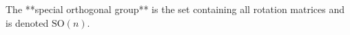 \documentclass[preview]{standalone}
\begin{document}
\begin{center}
The **special orthogonal group** is the set containing all rotation matrices and is denoted $\text{SO}(n)$.
\end{center}
\end{document}
